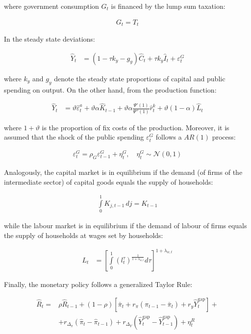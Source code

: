 \documentclass{pracamgr}
\numberwithin{equation}{section}
\begin{document}
where government consumption $G_{t}$ is financed by the lump sum taxation:

\begin{align}
G_{t} = T_{t}
\end{align}

In the steady state deviations:

\begin{align}
\hat{Y}_{t} &= \left( 1 - \tau k_{y} - g_{y} \right) \hat{C}_{t} + \tau k_{y} \hat{I}_{t} + \varepsilon_{t}^{G} 
\end{align}

where $k_{y}$ and $g_{y}$ denote the steady state proportions of capital and public spending on output. On the other hand, from the production function:

\begin{align}
\hat{Y}_{t} & = \vartheta \hat{\varepsilon}_{t}^{a} + \vartheta \alpha \hat{K}_{t-1} + \vartheta \alpha \frac{\Psi'(1)}{\Psi''(1)} \hat{r}_{t}^{k} + \vartheta(1-\alpha)\hat{L}_{t}
\end{align}

where $1+\vartheta$ is the proportion of fix costs of the production. Moreover, it is assumed that the shock of the public spending $\varepsilon_{t}^{G}$ follows a $AR(1)$ process:

\begin{align}
\varepsilon_{t}^{G} = \rho_{G} \varepsilon_{t-1}^{G} + \eta_{t}^{G}, \quad \eta_{t}^{G} \sim \mathcal{N}(0,1)
\end{align}

Analogously, the capital market is in equilibrium if the demand (of firms of the intermediate sector) of capital goods equals the supply of households:

\begin{align}
\int\limits_{0}^{1} K_{j,t-1} \, dj = K_{t-1}
\end{align} 

while the labour market is in equilibrium if the demand of labour of firms equals the supply of households at wages set by households:

\begin{align}
L_{t} &= \left[ \int\limits_{0}^{1} \left( l_{t}^{\tau} \right)^{\frac{1}{1+\lambda_{w,t}}} d\tau \right]^{1+\lambda_{w,t}}
\end{align}

Finally, the monetary policy follows a generalized Taylor Rule:

\begin{align}
\hat{R}_{t} =& \rho \hat{R}_{t-1} + (1-\rho) \left[ \bar{\pi}_{t} + r_{\pi} \left( \hat{\pi}_{t-1} - \bar{\pi}_{t} \right) + r_{y} \hat{Y}_{t}^{\text{gap}} \right] + \nonumber \\
& + r_{\Delta_{\pi}} \left( \hat{\pi}_{t} - \hat{\pi}_{t-1} \right) + r_{\Delta_{Y}} \left( \hat{Y}_{t}^{\text{gap}} - \hat{Y}_{t-1}^{\text{gap}} \right) + \eta_{t}^{R}
\end{align}
\end{document}
